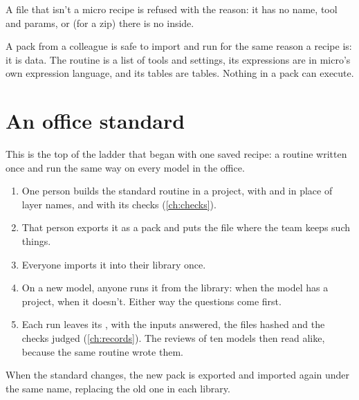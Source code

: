 A file that isn't a micro recipe is refused with the reason: it has no name, tool and params, or (for a zip) there is no  inside.

\begin{why}
A pack from a colleague is safe to import and run for the same reason a recipe is: it is data. The routine is a list of tools and settings, its expressions are in micro's own expression language, and its tables are tables. Nothing in a pack can execute.
\end{why}

\section{An office standard}\label{sec:library-office}
This is the top of the ladder that began with one saved recipe: a routine written once and run the same way on every model in the office.

\begin{enumerate}
\item One person builds the standard routine in a project, with  and  in place of layer names, and with its checks (\cref{ch:checks}).
\item That person exports it as a pack and puts the file where the team keeps such things.
\item Everyone imports it into their library once.
\item On a new model, anyone runs it from the library:  when the model has a project,  when it doesn't. Either way the questions come first.
\item Each run leaves its , with the inputs answered, the files hashed and the checks judged (\cref{ch:records}). The reviews of ten models then read alike, because the same routine wrote them.
\end{enumerate}

When the standard changes, the new pack is exported and imported again under the same name, replacing the old one in each library.
